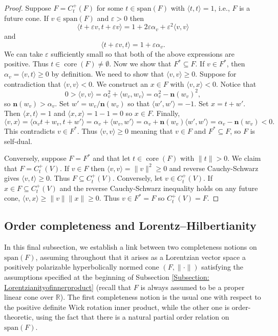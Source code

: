 \documentclass[a4paper,11pt]{article}
\numberwithin{equation}{section}
\theoremstyle{definition}
\theoremstyle{plain}
\newcommand{\R}{\mathbb R}
\newcommand{\spn}{\mathrm{span}}
\DeclareMathOperator{\core}{\text{core}}
\let\epsilon\varepsilon
\newcommand{\inner}[2]{\langle #1, #2 \rangle}
\newcommand{\norm}[1]{\| #1\|}
\begin{document}
\begin{proof}
    Suppose $F = C_{t}^{+}(F)$ for some $t \in \spn(F)$ with $\inner{t}{t} = 1$, i.e., $F$ is a future cone. If $v \in \spn(F)$ and $\epsilon > 0$ then
    $$\inner{t + \epsilon v}{t + \epsilon v} = 1 + 2 \epsilon \alpha_{v} + \epsilon^{2}\inner{v}{v}$$
    and
    $$\inner{t + \epsilon v}{t} = 1 + \epsilon \alpha_{v}.$$
    We can take $\epsilon$ sufficiently small so that both of the above expressions are positive. Thus $t \in \core(F) \neq \emptyset$. Now we show that $F^{*} \subseteq F$. If $v \in F^{*}$, then $\alpha_{v} = \inner{v}{t} \geq 0$ by definition. We need to show that $\inner{v}{v} \geq 0$. Suppose for contradiction that $\inner{v}{v} < 0$. We construct an $x \in F$ with $\inner{v}{x} < 0$. Notice that
    $$0 > \inner{v}{v} = \alpha_{v}^{2} + \inner{w_{v}}{w_{v}} = \alpha_{v}^{2} - \mathbf{n}(w_{v})^{2},$$
    so $\mathbf{n}(w_{v}) > \alpha_{v}$. Set $w' = w_{v}/\mathbf{n}(w_{v})$ so that $\inner{w'}{w'} = -1$. Set $x = t + w'$. Then $\inner{x}{t} = 1$ and $\inner{x}{x} = 1 - 1 = 0$ so $x \in F$. Finally, 
    $$\inner{v}{x} = \inner{\alpha_{v}t + w_{v}}{t + w'} = \alpha_{v} + \inner{w_{v}}{w'} = \alpha_{v} + \mathbf{n}(w_{v})\inner{w'}{w'} = \alpha_{v} - \mathbf{n}(w_{v}) < 0.$$
    This contradicts $v \in F^{*}$. Thus $\inner{v}{v} \geq 0$ meaning that $v \in F$ and $F^{*} \subseteq F$, so $F$ is self-dual.
    
    Conversely, suppose $F = F^{*}$ and that let $t \in \core(F)$ with $\norm{t} > 0$. We claim that $F = C_{t}^{+}(V)$. If $v \in F$ then $\inner{v}{v} = \norm{v}^{2} \geq 0$ and reverse Cauchy-Schwarz gives $\inner{v}{t} \geq 0$. Thus $F \subseteq C_{t}^{+}(V)$. Conversely, let $v \in C_{t}^{+}(V)$. If $x \in F \subseteq C_{t}^{+}(V)$ and the reverse Cauchy-Schwarz inequality holds on any future cone, $\inner{v}{x} \geq \norm{v}\norm{x} \geq 0$. Thus $v \in F^{*} = F$ so $C_{t}^{+}(V) = F$.
\end{proof}

\subsection{Order completeness and Lorentz--Hilbertianity}

In this final subsection, we establish a link between two completeness notions on $\spn(F)$, assuming throughout that it arises as a Lorentzian vector space a positively polarizable hyperbolically normed cone $(F,\norm{\cdot})$ satisfying the assumptions specified at the beginning of Subsection \ref{Subsection: Lorentzianityofinnerproduct} (recall that $F$ is always assumed to be a proper linear cone over $\R$). The first completeness notion is the usual one with respect to the positive definite Wick rotation inner product, while the other one is order-theoretic, using the fact that there is a natural partial order relation on $\spn(F)$.
\end{document}
